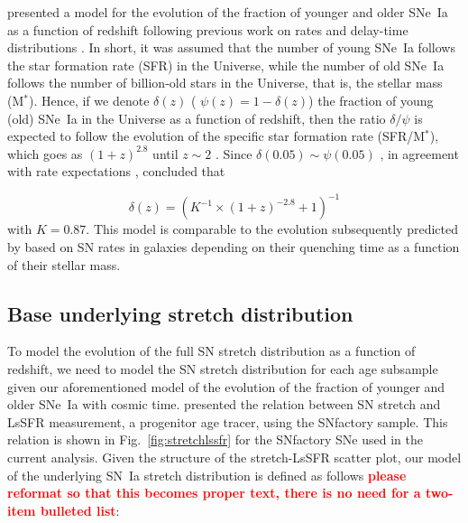 \documentclass[]{aa}
\newcommand{\LEt}[1]{\textcolor{red}{\textbf{ #1}}}
\begin{document}
\cite{rigault2020} presented a model for the evolution of the fraction of
younger and older SNe~Ia as a function of redshift following previous work on
rates and delay-time distributions \citep[e.g.,][]{mannucci2005,
scannapieco2005, sullivan2006, smith2012, childress2014, maozmannucci2014}.
In short, it was assumed that the number of young SNe~Ia follows the star
formation rate (SFR) in the Universe, while the number of old SNe~Ia follows
the number of billion-old stars in the Universe, that is, the stellar mass (M$^*$).
Hence, if we denote $\delta(z)$ ( $\psi(z) = 1-\delta(z)$) the fraction of
young (old) SNe~Ia in the Universe as a function of redshift, then the
ratio $\delta/\psi$ is expected to follow the evolution of the specific star
formation rate (SFR/M$^*$), which goes as $(1+z)^{2.8}$ until $z\sim2$
\citep[e.g.,][]{tasca2015}. Since $\delta(0.05) \sim \psi(0.05)$
\citep{rigault2013, rigault2020, wiseman2020}, in agreement with rate
expectations \citep{mannucci2006, rodney2014}, \cite{rigault2020} concluded that

\begin{equation}
    \label{eq:delta}
    \delta(z) = \left( K^{-1} \times (1+z)^{-2.8} +1 \right)^{-1}
\end{equation}
with $K=0.87$. This model is comparable to the evolution subsequently
predicted by \cite{childress2014} based on SN rates in galaxies depending on
their quenching time as a function of their stellar mass.

\subsection{Base underlying stretch distribution}
\label{sec:basemodel}

To model the evolution of the full SN stretch distribution as a function of
redshift, we need to model the SN stretch
distribution for each age subsample given our aforementioned model of the evolution of the fraction of
younger and older SNe~Ia with cosmic time. \cite{rigault2020} presented the relation between SN stretch and LsSFR
measurement, a progenitor age tracer, using the SNfactory sample. This relation
is shown in Fig.~\ref{fig:stretchlssfr} for the SNfactory SNe used in the
current analysis. Given the structure of the stretch-LsSFR scatter plot, our
model of the underlying SN~Ia stretch distribution is defined as follows\LEt{please reformat so that this becomes proper text, there is no need for a two-item bulleted list}:
\end{document}
